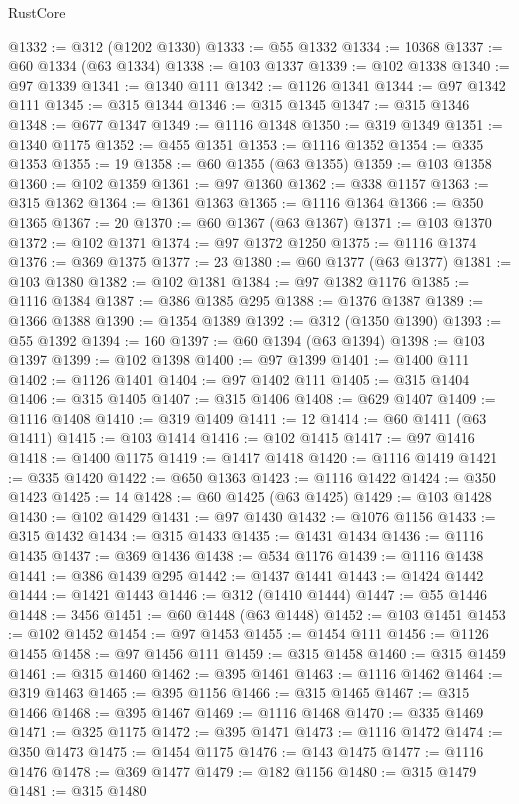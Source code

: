 \begin{lexlean}{RustCore}
\begin{coremodule}
@1332 := @312 (@1202 @1330)
@1333 := @55 @1332
@1334 := 10368
@1337 := @60 @1334 (@63 @1334)
@1338 := @103 @1337
@1339 := @102 @1338
@1340 := @97 @1339
@1341 := @1340 @111
@1342 := @1126 @1341
@1344 := @97 @1342 @111
@1345 := @315 @1344
@1346 := @315 @1345
@1347 := @315 @1346
@1348 := @677 @1347
@1349 := @1116 @1348
@1350 := @319 @1349
@1351 := @1340 @1175
@1352 := @455 @1351
@1353 := @1116 @1352
@1354 := @335 @1353
@1355 := 19
@1358 := @60 @1355 (@63 @1355)
@1359 := @103 @1358
@1360 := @102 @1359
@1361 := @97 @1360
@1362 := @338 @1157
@1363 := @315 @1362
@1364 := @1361 @1363
@1365 := @1116 @1364
@1366 := @350 @1365
@1367 := 20
@1370 := @60 @1367 (@63 @1367)
@1371 := @103 @1370
@1372 := @102 @1371
@1374 := @97 @1372 @1250
@1375 := @1116 @1374
@1376 := @369 @1375
@1377 := 23
@1380 := @60 @1377 (@63 @1377)
@1381 := @103 @1380
@1382 := @102 @1381
@1384 := @97 @1382 @1176
@1385 := @1116 @1384
@1387 := @386 @1385 @295
@1388 := @1376 @1387
@1389 := @1366 @1388
@1390 := @1354 @1389
@1392 := @312 (@1350 @1390)
@1393 := @55 @1392
@1394 := 160
@1397 := @60 @1394 (@63 @1394)
@1398 := @103 @1397
@1399 := @102 @1398
@1400 := @97 @1399
@1401 := @1400 @111
@1402 := @1126 @1401
@1404 := @97 @1402 @111
@1405 := @315 @1404
@1406 := @315 @1405
@1407 := @315 @1406
@1408 := @629 @1407
@1409 := @1116 @1408
@1410 := @319 @1409
@1411 := 12
@1414 := @60 @1411 (@63 @1411)
@1415 := @103 @1414
@1416 := @102 @1415
@1417 := @97 @1416
@1418 := @1400 @1175
@1419 := @1417 @1418
@1420 := @1116 @1419
@1421 := @335 @1420
@1422 := @650 @1363
@1423 := @1116 @1422
@1424 := @350 @1423
@1425 := 14
@1428 := @60 @1425 (@63 @1425)
@1429 := @103 @1428
@1430 := @102 @1429
@1431 := @97 @1430
@1432 := @1076 @1156
@1433 := @315 @1432
@1434 := @315 @1433
@1435 := @1431 @1434
@1436 := @1116 @1435
@1437 := @369 @1436
@1438 := @534 @1176
@1439 := @1116 @1438
@1441 := @386 @1439 @295
@1442 := @1437 @1441
@1443 := @1424 @1442
@1444 := @1421 @1443
@1446 := @312 (@1410 @1444)
@1447 := @55 @1446
@1448 := 3456
@1451 := @60 @1448 (@63 @1448)
@1452 := @103 @1451
@1453 := @102 @1452
@1454 := @97 @1453
@1455 := @1454 @111
@1456 := @1126 @1455
@1458 := @97 @1456 @111
@1459 := @315 @1458
@1460 := @315 @1459
@1461 := @315 @1460
@1462 := @395 @1461
@1463 := @1116 @1462
@1464 := @319 @1463
@1465 := @395 @1156
@1466 := @315 @1465
@1467 := @315 @1466
@1468 := @395 @1467
@1469 := @1116 @1468
@1470 := @335 @1469
@1471 := @325 @1175
@1472 := @395 @1471
@1473 := @1116 @1472
@1474 := @350 @1473
@1475 := @1454 @1175
@1476 := @143 @1475
@1477 := @1116 @1476
@1478 := @369 @1477
@1479 := @182 @1156
@1480 := @315 @1479
@1481 := @315 @1480

\end{coremodule}
\end{lexlean}
